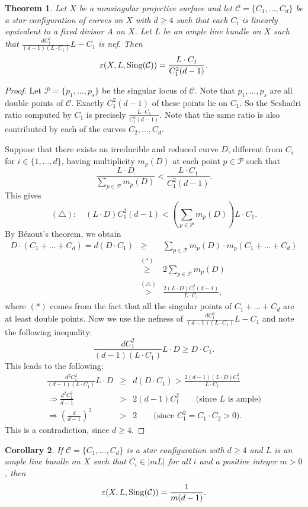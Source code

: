 \documentclass[12pt,reqno]{amsart}
\theoremstyle{plain}
\numberwithin{equation}{section}
\newtheorem{theorem}{Theorem}[section]
\newtheorem{corollary}[theorem]{Corollary}
\theoremstyle{definition}
\begin{document}
	
	\begin{theorem}
		\label{prop:star} Let $X$ be a nonsingular projective surface and let $\mathcal{C} = \{C_{1}, \ldots, C_{d}\}$ be a star configuration of curves on $X$ with $d \geq 4$ such that each $ C_i$ is linearly equivalent to a fixed divisor $A$ on $X$. Let $L$ be an ample line bundle on $X$
		such that  $\frac{dC_1^2}{(d-1)(L\cdot C_1)}L-C_1$ is nef.   Then 
		$$\varepsilon(X, L,{\rm Sing}(\mathcal{C})) = \frac{L\cdot C_1}{C_1^2(d-1)}.$$
	\end{theorem}
	\begin{proof}
	 Let $\mathcal{P} = \{p_{1}, \ldots, p_{s}\}$ be the singular locus of  $\mathcal{C}$. Note that $p_{1}, \ldots, p_{s}$ are all double points of 
	  $\mathcal{C}$. Exactly $C_1^2(d-1)$ of these points lie on $C_1$. So the Seshadri ratio computed by $C_1$ is precisely 
	  $ \frac{L\cdot C_1}{C_1^2(d-1)}$. Note that the same ratio is also contributed by each of the curves $C_2,\ldots, C_d$. 
	 
	 
	 Suppose that there exists an irreducible and reduced curve $D$, different from $C_{i}$ for $i \in \{1,\ldots, d\}$, having multiplicity $m_{p}(D)$ at each point $p \in \mathcal{P}$ such that
		$$\frac{L \cdot D}{\sum_{p \in \mathcal{P}} m_{p}(D)} < \frac{L\cdot C_1}{C_1^2(d-1)}.$$
This gives
		$$(\triangle) : \quad (L \cdot D)C_1^2(d-1) < \left(\sum_{p \in \mathcal{P}} m_{p}(D)\right)L\cdot C_1.$$
		By B\'ezout's theorem, we obtain
		\begin{eqnarray*}
		D\cdot (C_{1}+ \ldots + C_{d})=d(D\cdot C_1) &\geq& \sum_{p \in \mathcal{P}}m_{p}(D)\cdot m_{p}(C_{1}+ \ldots + C_{d})\\
		&\stackrel{(*)}{\geq}& 2\sum_{p \in \mathcal{P}} m_{p}(D) \\
		&\stackrel{(\triangle)}{>}& \frac{2(L \cdot D)C_1^2(d-1)}{L\cdot C_1},
		\end{eqnarray*}
		where $(*)$ comes from the fact that all the singular points of $C_{1}+ \ldots + C_{d}$ are at least double points. Now we use the nefness 
		of $\frac{dC_1^2}{(d-1)(L\cdot C_1)}L-C_1$ and note the following  inequality: 
		\[
		\frac{dC_1^2}{(d-1)(L\cdot C_1)}L\cdot D \geq D\cdot C_1.
		\] 
		This leads to the following:
		\begin{eqnarray*}
			\frac{d^2C_1^2}{(d-1)(L\cdot C_1)}L\cdot D &\geq& d (D\cdot C_1) > \frac{2(d-1)(L\cdot D)C_1^2}{L\cdot C_1} \\
			\Rightarrow \frac{d^2C_1^2}{d-1} &>& 2(d-1)C_1^2 \quad \quad \text{(since $L$ is ample)} \\
			\Rightarrow \left(\frac{d}{d-1} \right)^2 &>& 2 \quad \quad \text{(since $C_1^2 = C_1\cdot C_2 > 0$)}.
		\end{eqnarray*}
		This is a contradiction, since $d\geq 4$.
	\end{proof}
	\begin{corollary}
		\label{coro:star}
		If $\mathcal{C} = \{C_{1}, \ldots, C_{d}\}$ is a star configuration with $d \geq 4$  and $L$ is an ample line bundle on $X$ such that $ C_i \in |mL|$ for all $i$ and a positive integer $m>0$, then 
		$$\varepsilon(X, L,{\rm Sing}(\mathcal{C})) = \frac{1}{m(d-1)}.$$
	\end{corollary}
\end{document}
